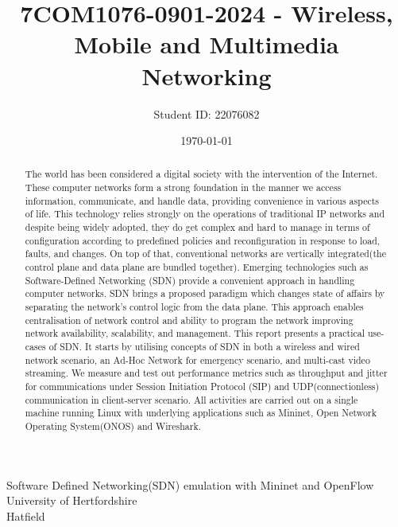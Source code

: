 \documentclass{article}
\title{7COM1076-0901-2024 - Wireless, Mobile and Multimedia Networking}
\author{Student ID: 22076082}
\date{\today}
\begin{document}
\maketitle
\vspace{100pt}
\begin{center}
	\huge{Software Defined Networking(SDN) emulation with Mininet and OpenFlow} \\ [100pt]
	\vspace{100pt}
	\large{University of Hertfordshire} \\
	\large{Hatfield}
\end{center}

\newpage
\tableofcontents
\newpage
\listoftables
\listoffigures

\newpage
\begin{abstract}
The world has been considered a digital society with the intervention of the Internet. These computer networks form a strong foundation in the manner we access information, communicate, and handle data, providing convenience in various aspects of life. This technology relies strongly on the operations of traditional IP networks and despite being widely adopted, they do get complex and hard to manage in terms of configuration according to predefined policies and reconfiguration in response to load, faults, and changes. On top of that, conventional networks are vertically integrated(the control plane and data plane are bundled together). Emerging technologies such as Software-Defined Networking (SDN) provide a convenient approach in handling computer networks. SDN brings a proposed paradigm which changes state of affairs by separating the network's control logic from the data plane. This approach enables centralisation of network control and ability to program the network improving network availability, scalability, and management. This report presents a practical use-cases of SDN. It starts by utilising concepts of SDN in both a wireless and wired network scenario, an Ad-Hoc Network for emergency scenario, and multi-cast video streaming. We measure and test out performance metrics such as throughput and jitter for communications under Session Initiation Protocol (SIP) and UDP(connectionless) communication in client-server scenario. All activities are carried out on a single machine running Linux with underlying applications such as Mininet, Open Network Operating System(ONOS) and Wireshark.
\end{abstract}

\newpage
\end{document}
